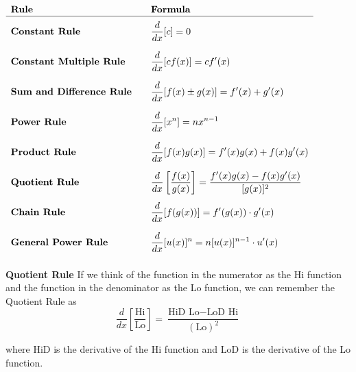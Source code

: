 \documentclass{ximera}
\begin{document}
~ \\[2em]


$
\begin{array}{ll}
\textbf{Rule} & \quad \textbf{Formula} \\ \hline

\textbf{Constant Rule} & \quad \displaystyle \frac{d}{dx} [c] = 0 \vphantom{\left( \frac{\frac{\frac{A}{B}}{C}}{\frac{D}{E}} \right)} \\

\textbf{Constant Multiple Rule} & \quad \displaystyle \frac{d}{dx}[cf(x)] = c f'(x) \vphantom{\left( \frac{\frac{\frac{A}{B}}{C}}{\frac{D}{E}} \right)} \\

\textbf{Sum and Difference Rule} & \quad \displaystyle \frac{d}{dx}[f(x) \pm g(x)]  = f'(x) + g'(x) \vphantom{\left( \frac{\frac{\frac{A}{B}}{C}}{\frac{D}{E}} \right)} \\

\textbf{Power Rule} & \quad \displaystyle \frac{d}{dx}[x^n] = nx^{n-1} \vphantom{\left( \frac{\frac{\frac{A}{B}}{C}}{\frac{D}{E}} \right)} \\

\textbf{Product Rule} & \quad \displaystyle \frac{d}{dx}[f(x)g(x)] = f'(x)g(x) + f(x)g'(x) \vphantom{\left( \frac{\frac{\frac{A}{B}}{C}}{\frac{D}{E}} \right)} \\

\textbf{Quotient Rule} & \quad \displaystyle \frac{d}{dx}\left[\frac{f(x)}{g(x)}\right] = \frac{f'(x)g(x) - f(x)g'(x)}{[g(x)]^2} \vphantom{\left( \frac{\frac{\frac{A}{B}}{C}}{\frac{D}{E}} \right)} \\

\textbf{Chain Rule} & \quad \displaystyle \frac{d}{dx}[f(g(x))] = f'(g(x)) \cdot g'(x) \vphantom{\left( \frac{\frac{\frac{A}{B}}{C}}{\frac{D}{E}} \right)} \\

\textbf{General Power Rule} & \quad \displaystyle \frac{d}{dx}[u(x)]^n = n[u(x)]^{n-1} \cdot u'(x) \vphantom{\left( \frac{\frac{\frac{A}{B}}{C}}{\frac{D}{E}} \right)} \\
\end{array}
$


\begin{remark}
\textcolor{orange!80!black}{\textbf{Quotient Rule}} If we think of the function in the numerator as the Hi function and the function in the denominator as the Lo function,
we can remember the Quotient Rule as
\[ \frac{d}{dx} \left[\frac{\textrm{Hi}}{\textrm{Lo}} \right]  = \frac{\textrm{HiD  Lo} - \textrm{LoD  Hi}}{(\textrm{Lo})^2}  \]

where HiD is the derivative of the Hi function and LoD is the derivative of the Lo function.
\end{remark}
\end{document}

